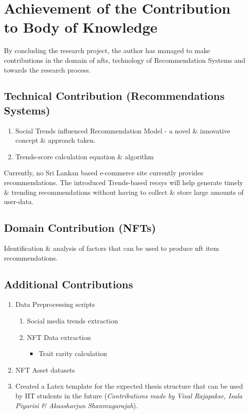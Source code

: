 \section{Achievement of the Contribution to Body of Knowledge}

By concluding the research project, the author has managed to make contributions in the domain of \gls{nft}s, technology of Recommendation Systems and towards the research process.

\subsection{Technical Contribution (Recommendations Systems)}

\begin{enumerate}
\item Social Trends influenced Recommendation Model - a novel \& innovative concept \& approach taken.
\item Trends-score calculation equation \& algorithm
\end{enumerate}

\noindent Currently, no Sri Lankan based e-commerce site currently provides recommendations. The introduced Trends-based \gls{recsys} will help generate timely \& trending recommendations without having to collect \& store large amounts of user-data.

\subsection{Domain Contribution (NFTs)}
Identification \& analysis of factors that can be used to produce \gls{nft} item recommendations.

\subsection{Additional Contributions}
\begin{enumerate}
\item Data Preprocessing scripts
    \begin{enumerate}
        \item Social media trends extraction
        \item NFT Data extraction
        \begin{itemize}
            \item Trait rarity calculation
        \end{itemize}
     \end{enumerate}
     
\item NFT Asset datasets
\item Created a Latex template for the expected thesis structure that can be used by IIT students in the future (\textit{Contributions made by Visal Rajapakse, Isala Piyarisi \& Akassharjun Shanmugarajah}).
\end{enumerate}


